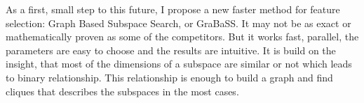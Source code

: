 As a first, small step to this future, I propose a new faster method for feature selection: Graph Based Subspace Search, or GraBaSS. It may not be as exact or mathematically proven as some of the competitors. But it works fast, parallel, the parameters are easy to choose and the results are intuitive. It is build on the insight, that most of the dimensions of a subspace are similar or not which leads to binary relationship. This relationship is enough to build a graph and find cliques that describes the subspaces in the most cases.
